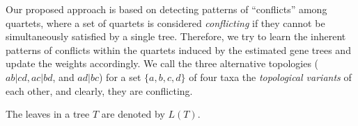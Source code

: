 \documentclass[runningheads]{llncs}
\begin{document}
Our proposed approach is based on detecting patterns of ``conflicts'' among quartets, where a set of quartets is considered \textit{conflicting} if they cannot be simultaneously satisfied by a single tree. Therefore, we try to learn the inherent patterns of conflicts within the quartets induced by the estimated gene trees and update the weights accordingly. We call the three alternative topologies ($ab|cd, ac|bd$, and $ad|bc$) for a set $\{a,b,c,d\}$ of four taxa the \textit{topological variants} of each other, and clearly, they are conflicting.



The leaves in a tree $T$ are denoted by $L(T)$.


\end{document}
